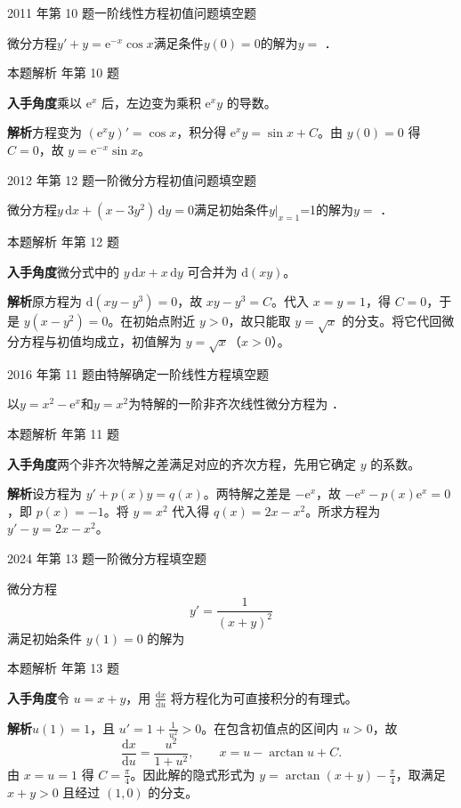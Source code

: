 \documentclass[UTF8,zihao=-4,fontset=fandol]{ctexart}
\newcommand{\blank}{\underline{\hspace{5em}}}
\newcommand{\QuestionPage}[6]{%
  \par\noindent\begin{minipage}{\linewidth}
  \raggedright
  {\small\textcolor{black!60}{#3\quad #5}\hfill\textcolor{accent}{#2}}\par\smallskip}
\newcommand{\QuestionEnd}{\end{minipage}\par\medskip}
\newcommand{\QuestionPage}[6]{%
  \clearpage
  {\small\textcolor{accent}{#1\hfill #2}}\par\medskip
  {\small\textcolor{black!60}{#3\quad #5\hfill #6}}\par\vspace{9bp}}
\newcommand{\QuestionEnd}{}
\newenvironment{QuestionSolution}[1]{%
  \clearpage
  {\small\textcolor{black!60}{本题解析\quad #1}}\par\medskip
}{\par\clearpage}
\begin{document}
\QuestionPage{4.1 几类简单的微分方程}{填空题}{2011 年第 10 题}{1}{一阶线性方程初值问题}{203 / 234}
微分方程$y' + y = \mathrm{e}^{- x}\cos x$满足条件$y(0) = 0$的解为$y =$ \blank{}．
\QuestionEnd

\begin{QuestionSolution}{2011 年第 10 题}
\textbf{入手角度}\quad 乘以 \(\mathrm{e}^x\) 后，左边变为乘积 \(\mathrm{e}^xy\) 的导数。

\textbf{解析}\quad 方程变为 \((\mathrm{e}^xy)'=\cos x\)，积分得 \(\mathrm{e}^xy=\sin x+C\)。由 \(y(0)=0\) 得 \(C=0\)，故 \(y=\boxed{\mathrm{e}^{-x}\sin x}\)。
\end{QuestionSolution}

\QuestionPage{4.1 几类简单的微分方程}{填空题}{2012 年第 12 题}{2}{一阶微分方程初值问题}{204 / 234}
微分方程$y\,\mathrm{d} x + (x - 3y^2)\,\mathrm{d} y = 0$满足初始条件$y|_{x = 1}$=1的解为$y =$ \blank{}．
\QuestionEnd

\begin{QuestionSolution}{2012 年第 12 题}
\textbf{入手角度}\quad 微分式中的 \(y\,\mathrm{d}x+x\,\mathrm{d}y\) 可合并为 \(\mathrm{d}(xy)\)。

\textbf{解析}\quad 原方程为 \(\mathrm{d}(xy-y^3)=0\)，故 \(xy-y^3=C\)。代入 \(x=y=1\)，得 \(C=0\)，于是 \(y(x-y^2)=0\)。在初始点附近 \(y>0\)，故只能取 \(y=\sqrt{x}\) 的分支。将它代回微分方程与初值均成立，初值解为 \(y=\boxed{\sqrt{x}}\)（\(x>0\)）。
\end{QuestionSolution}

\QuestionPage{4.1 几类简单的微分方程}{填空题}{2016 年第 11 题}{2}{由特解确定一阶线性方程}{205 / 234}
以$y = x^2 - \mathrm{e}^x$和$y = x^2$为特解的一阶非齐次线性微分方程为 \blank{}．
\QuestionEnd

\begin{QuestionSolution}{2016 年第 11 题}
\textbf{入手角度}\quad 两个非齐次特解之差满足对应的齐次方程，先用它确定 \(y\) 的系数。

\textbf{解析}\quad 设方程为 \(y'+p(x)y=q(x)\)。两特解之差是 \(-\mathrm{e}^x\)，故 \(-\mathrm{e}^x-p(x)\mathrm{e}^x=0\)，即 \(p(x)=-1\)。将 \(y=x^2\) 代入得 \(q(x)=2x-x^2\)。所求方程为 \(\boxed{y'-y=2x-x^2}\)。
\end{QuestionSolution}

\QuestionPage{4.1 几类简单的微分方程}{填空题}{2024 年第 13 题}{2}{一阶微分方程}{206 / 234}
微分方程
\[y'=\frac{1}{(x+y)^2}
\]
满足初始条件 \(y(1)=0\) 的解为 \blank{}
\QuestionEnd

\begin{QuestionSolution}{2024 年第 13 题}
\textbf{入手角度}\quad 令 \(u=x+y\)，用 \(\frac{\mathrm{d}x}{\mathrm{d}u}\) 将方程化为可直接积分的有理式。

\textbf{解析}\quad \(u(1)=1\)，且 \(u'=1+\frac{1}{u^2}>0\)。在包含初值点的区间内 \(u>0\)，故
\[
\frac{\mathrm{d}x}{\mathrm{d}u}=\frac{u^2}{1+u^2},
\qquad x=u-\arctan u+C .
\]
由 \(x=u=1\) 得 \(C=\frac{\pi}{4}\)。因此解的隐式形式为 \(\boxed{y=\arctan(x+y)-\frac{\pi}{4}}\)，取满足 \(x+y>0\) 且经过 \((1,0)\) 的分支。
\end{QuestionSolution}
\end{document}
